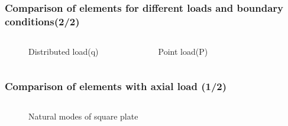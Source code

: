 \documentclass[9pt]{beamer}
\begin{document}
\begin{frame}\frametitle{Comparison of elements for different loads and boundary conditions(2/2)}
\begin{columns}
\begin{figure}



\caption{Distributed load(q)}
\end{figure}
\begin{figure}



\caption{Point load(P)}
\end{figure}
\end{columns}
\end{frame}


\begin{frame}\frametitle{Comparison of elements with axial load (1/2)}
\begin{columns}
\begin{figure}
	\centering
	\qquad \qquad 
	\caption{Natural modes of square plate}

\end{figure}


\end{columns}
\end{frame}
\end{document}
